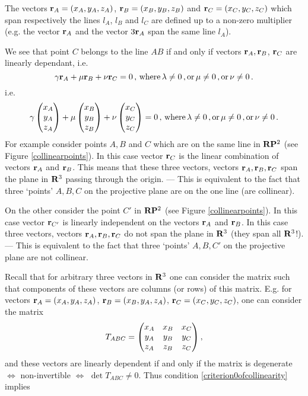 \documentclass[12pt]{article}
\numberwithin{equation}{section}
\begin{document}
The vectors  
${\bf r}_A=(x_A,y_A,z_A)$, 
${\bf r}_B=(x_B,y_B,z_B)$ 
and ${\bf r}_C=(x_C,y_C,z_C)$ 
which span  respectively the lines $l_A$, $l_B$
and $l_C$
are  defined up to a non-zero multiplier (e.g. the vector ${\bf r}_A$ 
and the vector $3{\bf r}_A$ span the same line $l_A$). 


We see that point $C$ belongs to the line $AB$ if and only if
vectors 
${\bf r}_A,{\bf r}_B$, ${\bf r}_C$ are linearly dependant, i.e.
         \begin{equation*}
  \gamma{\bf r}_A+\mu{\bf r}_B+\nu {\bf r}_C=0 \,,\,{\rm where}\, 
\lambda\not=0\,,{\rm or}\,
\mu\not=0\,,{\rm or}\,
\nu\not=0\,.
    \end{equation*}
i.e.
       \begin{equation}\label{criterion0ofcollinearity}
              \gamma 
         \begin{pmatrix}
      x_A\cr y_A\cr z_A
         \end{pmatrix}
                 +
                  \mu 
         \begin{pmatrix}
      x_B\cr y_B\cr z_B
         \end{pmatrix}
               +
   \nu 
         \begin{pmatrix}
      x_C\cr y_C\cr z_C
         \end{pmatrix}
            =0\,,\,
{\rm where}\, 
\lambda\not=0\,,{\rm or}\,
\mu\not=0\,,{\rm or}\,
\nu\not=0\,.
         \end{equation}
For example consider points $A,B$ and $C$ which are on the same line
in ${\bf R}{\bf P}^2$ (see Figure \eqref{collinearpoints}).
In this case vector ${\bf r}_C$ is the linear combination of vectors
${\bf r}_A$ and ${\bf r}_B$. This means that these three vectors,
vectors ${\bf r}_A,{\bf r}_B, {\bf r}_C$ span the plane
in ${\bf R}^3$ passing through the origin. --- This is  equivalent to the fact
that three `points' $A,B,C$ on the projective plane
are on the one line (are collinear).

On the other consider the point  $C'$
in ${\bf R}{\bf P}^2$ (see Figure \eqref{collinearpoints}).
In this case vector ${\bf r}_{C'}$ is 
linearly independent on the vectors ${\bf r}_A$ and ${\bf r}_B$.
In this case  three vectors,
vectors ${\bf r}_A,{\bf r}_B, {\bf r}_C$ do not span the plane
in ${\bf R}^3$ (they span all ${\bf R}^3$!).---
This is equivalent to the fact  
that three `points' $A,B,C'$ on the projective plane
are not collinear.



  Recall that for arbitrary three vectors in ${\bf R}^3$  
one can consider the matrix such that components of these vectors
are columns (or rows) of this matrix. E.g. for vectors
   ${\bf r}_A=(x_A,y_A,z_A)$,
   ${\bf r}_B=(x_B,y_A,z_A)$,
   ${\bf r}_C=(x_C,y_C,z_C)$,
one can consider the matrix
   $$
   T_{ABC}=\begin{pmatrix}
             x_A & x_B & x_C\cr 
             y_A & y_B & y_C\cr 
             z_A & z_B & z_C\cr 
           \end{pmatrix},
   $$
and these vectors are linearly dependent if and only if the matrix
is degenerate $\Leftrightarrow$ non-invertible $\Leftrightarrow$ 
$\det T_{ABC}\not=0$.
Thus 
  condition \eqref{criterion0ofcollinearity} implies  
\end{document}
